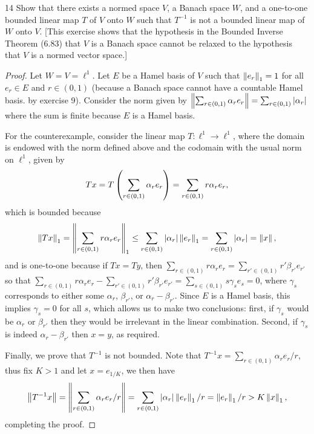 \begin{exercise}{14}
Show that there exists a normed space $V$, a Banach space $W$, and a one-to-one bounded linear map $T$ of $V$ onto $W$ such that $T^{-1}$ is not a bounded linear map of $W$ onto $V$.
[This exercise shows that the hypothesis in the Bounded Inverse Theorem (6.83) that $V$ is a Banach space cannot be relaxed to the hypothesis that $V$ is a normed vector space.]
\end{exercise}
\begin{proof}
Let $W = V = \ell^1$.
Let $E$ be a Hamel basis of $V$ such that $\left\lVert e_r\right\rVert_1 = 1$ for all $e_r \in E$ and $r \in (0, 1)$ (because a Banach space cannot have a countable Hamel basis. by exercise 9).
Consider the norm given by $\left\lVert  \sum_{r \in (0,1)} \alpha_r e_r \right\rVert = \sum_{r \in (0,1)} \left\lvert \alpha_r\right\rvert$ where the sum is finite because $E$ is a Hamel basis.

For the counterexample, consider the linear map $T: \ell^1 \to \ell^1$, where the domain is endowed with the norm defined above and the codomain with the usual norm on $\ell^1$, given by 
\begin{align*}
    Tx 
    = T\left( \sum_{r \in (0,1)} \alpha_r e_r\right) 
    = \sum_{r \in (0,1)} r \alpha_r e_r,
\end{align*}
which is bounded because 
\begin{align*}
    \left\lVert Tx\right\rVert_1
    = \left\lVert \sum_{r \in (0,1)} r \alpha_r e_r\right\rVert_1
    \leq \sum_{r \in (0,1)} \left\lvert \alpha_r\right\rvert \left\lVert e_r\right\rVert_1
    = \sum_{r \in (0,1)} \left\lvert \alpha_r\right\rvert
    = \left\lVert x\right\rVert,
\end{align*}
and is one-to-one because if $Tx = Ty$, then $\sum_{r \in (0,1)} r \alpha_r e_r = \sum_{r' \in (0,1)} r' \beta_{r'} e_{r'}$ so that $\sum_{r \in (0,1)} r \alpha_r e_r - \sum_{r' \in (0,1)} r' \beta_{r'} e_{r'} = \sum_{s \in (0,1)} s \gamma_s e_s = 0$, where $\gamma_s$ corresponds to either some $\alpha_r$, $\beta_{r'}$, or $\alpha_r - \beta_{r'}$.
Since $E$ is a Hamel basis, this implies $\gamma_s = 0$ for all $s$, which allows us to make two conclusions:
first, if $\gamma_s$ would be $\alpha_r$ or $\beta_{r'}$ then they would be irrelevant in the linear combination.
Second, if $\gamma_s$ is indeed $\alpha_r - \beta_{r'}$ then $x = y$, as required.

Finally, we prove that $T^{-1}$ is not bounded.
Note that $T^{-1} x = \sum_{r \in (0,1)} \alpha_r e_r / r$, thus fix $K > 1$ and let $x = e_{1/K}$, we then have
\begin{align*}
    \left\lVert T^{-1}x\right\rVert
    = \left\lVert \sum_{r \in (0,1)} \alpha_r e_r /r\right\rVert
    = \sum_{r \in (0,1)} \left\lvert \alpha_r\right\rvert \left\lVert e_r\right\rVert_1 / r
    = \left\lVert e_r\right\rVert_1 / r
    > K\left\lVert x\right\rVert_1,
\end{align*}
completing the proof.
\end{proof} 

